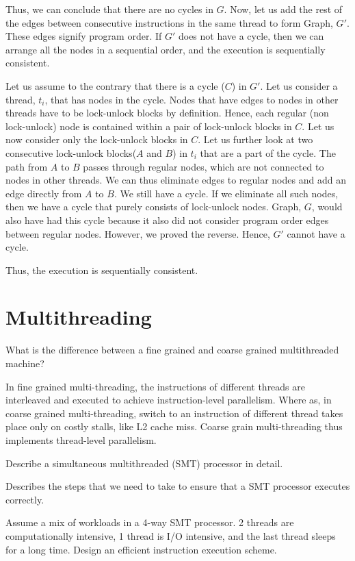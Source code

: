 \begin{ExerciseList}
Thus, we can conclude that there are no cycles in $G$. Now, let us add the rest of the edges
between consecutive instructions in the same thread to form Graph, $G'$. These edges signify program order. 
If $G'$ does not have a cycle, then we can arrange all the nodes in a sequential order, and the
execution is sequentially consistent.

Let us assume to the contrary that there is a cycle ($C$) in $G'$. Let us consider a thread, $t_i$, that has nodes
in the cycle. Nodes that have edges to nodes in other threads have to be lock-unlock blocks by
definition. Hence, each regular (non lock-unlock) node is contained within
a pair of lock-unlock blocks in $C$. 
Let us now consider only the lock-unlock blocks in $C$. Let us further look at two consecutive lock-unlock
blocks($A$ and $B$) in $t_i$
that are a part of the cycle. The path from $A$ to $B$ passes through regular nodes, which are not
connected to nodes in other threads. We can thus eliminate edges to regular nodes
and add an edge directly from $A$ to $B$.
We still have a cycle. If we eliminate all such nodes, then we have a cycle that purely consists
of lock-unlock nodes. Graph, $G$, would also have had this cycle because it also did not consider
program order edges between regular nodes. However, we proved  the reverse.
Hence, $G'$ cannot have a cycle.

Thus, the execution is sequentially consistent.


\end{ExerciseList}


\section *{Multithreading}

\begin{ExerciseList}


\Exercise
What is the difference between a fine grained and coarse grained multithreaded machine?

\Answer
In fine grained multi-threading, the instructions of different threads are interleaved and executed to achieve instruction-level
parallelism. Where as, in coarse grained multi-threading, switch to an instruction of different thread takes place only on costly
stalls, like L2 cache miss. Coarse grain multi-threading thus implements thread-level parallelism.


\Exercise
Describe a simultaneous multithreaded (SMT) processor in detail.

\Exercise
Describes the steps that we need to take to ensure that a SMT processor executes correctly.

\Exercise
Assume a mix of workloads in a 4-way SMT processor. 2 threads are computationally intensive, 1 thread
is I/O intensive, and the last thread sleeps for a long time. Design an efficient instruction execution scheme.

\end{ExerciseList}


